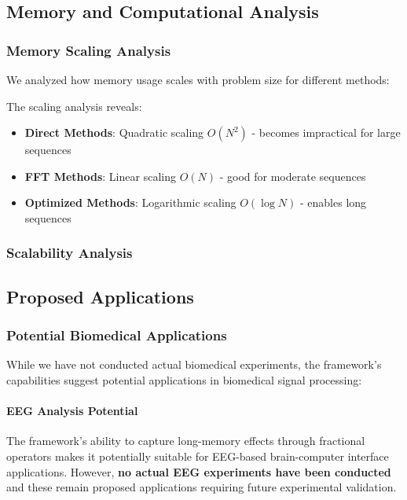 \subsection{Memory and Computational Analysis}

\subsubsection{Memory Scaling Analysis}

We analyzed how memory usage scales with problem size for different methods:


The scaling analysis reveals:
\begin{itemize}
    \item \textbf{Direct Methods}: Quadratic scaling $O(N^2)$ - becomes impractical for large sequences
    \item \textbf{FFT Methods}: Linear scaling $O(N)$ - good for moderate sequences
    \item \textbf{Optimized Methods}: Logarithmic scaling $O(\log N)$ - enables long sequences
\end{itemize}

\subsubsection{Scalability Analysis}


\subsection{Proposed Applications}

\subsubsection{Potential Biomedical Applications}

While we have not conducted actual biomedical experiments, the framework's capabilities suggest potential applications in biomedical signal processing:

\paragraph{EEG Analysis Potential}
The framework's ability to capture long-memory effects through fractional operators makes it potentially suitable for EEG-based brain-computer interface applications. However, \textbf{no actual EEG experiments have been conducted} and these remain proposed applications requiring future experimental validation.

